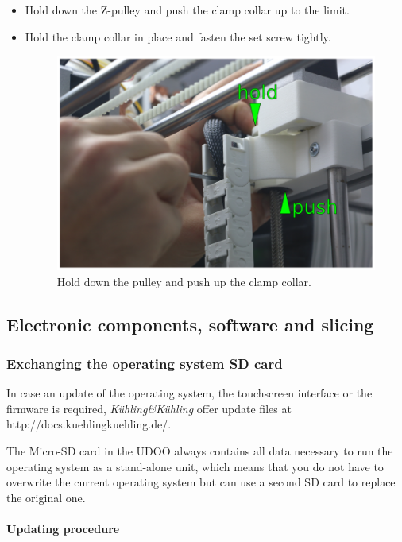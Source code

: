 \begin{itemize}
  \item Hold down the Z-pulley and push the clamp collar up to the limit.
  \item Hold the clamp collar in place and fasten the set screw tightly.

    \begin{figure}[H]
      \centering
      \includegraphics[width=.7\linewidth]{./img/mtc_z-axis_pushclampcollarup.png}
      \caption{Hold down the pulley and push up the clamp collar.}
    \end{figure}
\end{itemize}



\subsection{Electronic components, software and slicing}

\subsubsection{Exchanging the operating system SD card}

In case an update of the operating system, the touchscreen interface or the firmware is required, \emph{Kühling\&Kühling} offer update files at http://docs.kuehlingkuehling.de/. 

The Micro-SD card in the UDOO always contains all data necessary to run the operating system as a stand-alone unit, which means that you do not have to overwrite the current operating system but can use a second SD card to replace the original one. 

\paragraph{Updating procedure}


